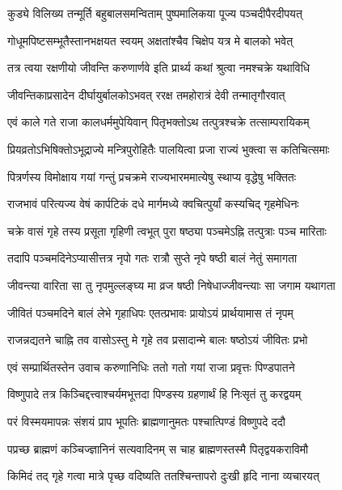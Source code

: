 \twolineshloka
{कुड्ये विलिख्य तन्मूर्ति बहुबालसमन्विताम्}
{पुष्पमालिकया पूज्य पञ्चदीपैरदीपयत्} %

\twolineshloka
{गोधूमपिष्टसम्भूतैस्तानभक्षयत स्वयम्}
{अक्षतांश्चैव चिक्षेप यत्र मे बालको भवेत्} %

\twolineshloka
{तत्र त्वया रक्षणीयो जीवन्ति करुणार्णवे}
{इति प्रार्थ्य कथां श्रुत्वा नमश्चक्रे यथाविधि} %

\twolineshloka
{जीवन्तिकाप्रसादेन दीर्घायुर्बालकोऽभवत्}
{ररक्ष तमहोरात्रं देवी तन्मातृगौरवात्} %

\twolineshloka
{एवं काले गते राजा कालधर्ममुपेयिवान्}
{पितृभक्तोऽथ तत्पुत्रश्चक्रे तत्साम्परायिकम्} %

\twolineshloka
{प्रियव्रतोऽभिषिक्तोऽभूद्राज्ये मन्त्रिपुरोहितैः}
{पालयित्वा प्रजा राज्यं भुक्त्वा स कतिचित्समाः} %

\twolineshloka
{पित्रर्णस्य विमोक्षाय गयां गन्तुं प्रचक्रमे}
{राज्यभारममात्येषु स्थाप्य वृद्धेषु भक्तितः} %

\twolineshloka
{राजभावं परित्यज्य वेषं कार्पटिकं दधे}
{मार्गमध्ये क्वचित्पुर्यां कस्यचिद् गृहमेधिनः} %

\twolineshloka
{चक्रे वासं गृहे तस्य प्रसूता गृहिणी त्वभूत्}
{पुरा षष्ठ्या पञ्चमेऽह्नि तत्पुत्राः पञ्च मारिताः} %

\twolineshloka
{तदापि पञ्चमदिनेऽप्यासीत्तत्र नृपो गतः}
{रात्रौ सुप्ते नृपे षष्ठी बालं नेतुं समागता} %

\twolineshloka
{जीवन्त्या वारिता सा तु नृपमुल्लङ्घ्य मा व्रज}
{षष्ठी निषेधाज्जीवन्त्याः सा जगाम यथागता} %

\twolineshloka
{जीवितं पञ्चमदिने बालं लेभे गृहाधिपः}
{एतत्प्रभावः प्रायोऽयं प्रार्थयामास तं नृपम्} %

\twolineshloka
{राजन्नद्यतने चाह्नि तव वासोऽस्तु मे गृहे}
{तव प्रसादान्मे बालः षष्ठोऽयं जीवितः प्रभो} %

\twolineshloka
{एवं सम्प्रार्थितस्तेन उवाच करुणानिधिः}
{ततो गतो गयां राजा प्रवृत्तः पिण्डपातने} %

\twolineshloka
{विष्णुपादे तत्र किञ्चिद्दत्त्वाश्चर्यमभूत्तदा}
{पिण्डस्य ग्रहणार्थं हि निःसृतं तु करद्वयम्} %

\twolineshloka
{परं विस्मयमापन्नः संशयं प्राप भूपतिः}
{ब्राह्मणानुमतः पश्चात्पिण्डं विष्णुपदे ददौ} %

\twolineshloka
{पप्रच्छ ब्राह्मणं कञ्चिज्ज्ञानिनं सत्यवादिनम्}
{स चाह ब्राह्मणस्तस्मै पितृद्वयकराविमौ} %

\twolineshloka
{किमिदं तद् गृहे गत्वा मात्रे पृच्छ वदिष्यति}
{ततश्चिन्तापरो दुःखी हृदि नाना व्यचारयत्} %

